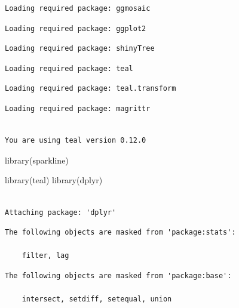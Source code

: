 \documentclass[
  letterpaper,
  DIV=11,
  numbers=noendperiod]{scrreprt}
\newenvironment{Shaded}{\begin{snugshade}}{\end{snugshade}}
\newcommand{\FunctionTok}[1]{\textcolor[rgb]{0.28,0.35,0.67}{#1}}
\newcommand{\NormalTok}[1]{\textcolor[rgb]{0.00,0.23,0.31}{#1}}
\begin{document}
\begin{verbatim}
Loading required package: ggmosaic
\end{verbatim}

\begin{verbatim}
Loading required package: ggplot2
\end{verbatim}

\begin{verbatim}
Loading required package: shinyTree
\end{verbatim}

\begin{verbatim}
Loading required package: teal
\end{verbatim}

\begin{verbatim}
Loading required package: teal.transform
\end{verbatim}

\begin{verbatim}
Loading required package: magrittr
\end{verbatim}

\begin{verbatim}

You are using teal version 0.12.0
\end{verbatim}

\begin{Shaded}
\begin{Highlighting}[]
\FunctionTok{library}\NormalTok{(sparkline)}
\end{Highlighting}
\end{Shaded}

\begin{Shaded}
\begin{Highlighting}[]
\FunctionTok{library}\NormalTok{(teal)}
\FunctionTok{library}\NormalTok{(dplyr)}
\end{Highlighting}
\end{Shaded}

\begin{verbatim}

Attaching package: 'dplyr'
\end{verbatim}

\begin{verbatim}
The following objects are masked from 'package:stats':

    filter, lag
\end{verbatim}

\begin{verbatim}
The following objects are masked from 'package:base':

    intersect, setdiff, setequal, union
\end{verbatim}
\end{document}
